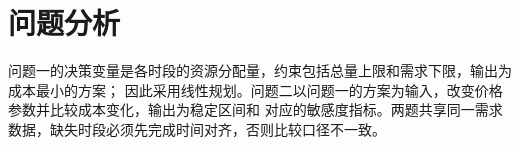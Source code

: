 \section{问题分析}
问题一的决策变量是各时段的资源分配量，约束包括总量上限和需求下限，输出为成本最小的方案；
因此采用线性规划。问题二以问题一的方案为输入，改变价格参数并比较成本变化，输出为稳定区间和
对应的敏感度指标。两题共享同一需求数据，缺失时段必须先完成时间对齐，否则比较口径不一致。
